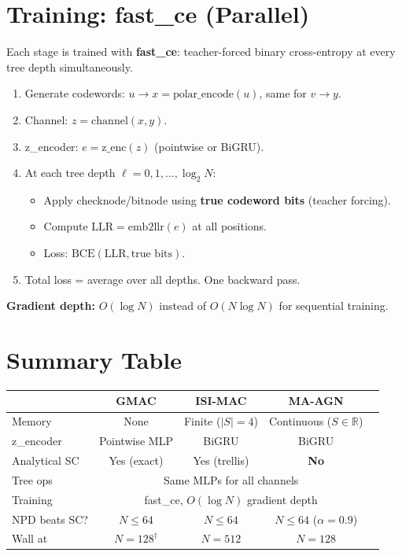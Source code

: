 \documentclass[11pt]{article}
\begin{document}
\section{Training: fast\_ce (Parallel)}

Each stage is trained with \textbf{fast\_ce}: teacher-forced binary cross-entropy at every tree depth simultaneously.

\begin{enumerate}
\item Generate codewords: $u \to x = \text{polar\_encode}(u)$, same for $v \to y$.
\item Channel: $z = \text{channel}(x, y)$.
\item z\_encoder: $e = \text{z\_enc}(z)$ (pointwise or BiGRU).
\item At each tree depth $\ell = 0, 1, \ldots, \log_2 N$:
\begin{itemize}
\item Apply checknode/bitnode using \textbf{true codeword bits} (teacher forcing).
\item Compute $\text{LLR} = \text{emb2llr}(e)$ at all positions.
\item Loss: $\text{BCE}(\text{LLR}, \text{true bits})$.
\end{itemize}
\item Total loss = average over all depths. One backward pass.
\end{enumerate}

\textbf{Gradient depth:} $O(\log N)$ instead of $O(N \log N)$ for sequential training.

\section{Summary Table}

\renewcommand{\arraystretch}{1.3}
\begin{center}\small
\begin{tabular}{@{}l c c c c@{}}
\toprule
& \textbf{GMAC} & \textbf{ISI-MAC} & \textbf{MA-AGN} \\
\midrule
Memory & None & Finite ($|S|=4$) & Continuous ($S \in \mathbb{R}$) \\
z\_encoder & Pointwise MLP & BiGRU & BiGRU \\
Analytical SC & Yes (exact) & Yes (trellis) & \textbf{No} \\
Tree ops & \multicolumn{3}{c}{Same MLPs for all channels} \\
Training & \multicolumn{3}{c}{fast\_ce, $O(\log N)$ gradient depth} \\
\midrule
NPD beats SC? & $N \le 64$ & $N \le 64$ & $N \le 64$ ($\alpha{=}0.9$) \\
Wall at & $N = 128^\dagger$ & $N = 512$ & $N = 128$ \\
\bottomrule
\end{tabular}
\end{center}
\end{document}
